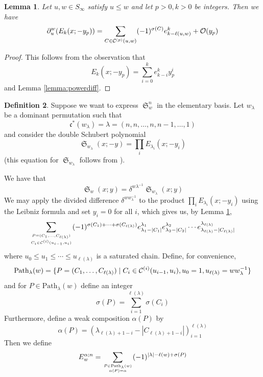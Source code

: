 \documentclass{amsart}
\newtheorem{lemma}{Lemma}[subsection]
\theoremstyle{definition}
\newtheorem{definition}[lemma]{Definition}
\theoremstyle{remark}
\numberwithin{equation}{subsection}
\DeclareMathOperator{\sch}{\mathfrak{S}}
\newcommand{\code}{\mathfrak{c}}
\begin{document}
\begin{lemma} \label{lemma:doublediff}
  Let $u,w\in S_\infty$ satisfy $u\leq w$ and let $p>0,k>0$ be integers. Then we have
  $$\partial_u^w(E_k(x;-y_p))=\sum_{C\in\mathcal{C}^{(p)}(u,w)}(-1)^{\sigma(C)}e_{k-\ell(u,w)}^k+\mathcal{O}(y_p)$$
\end{lemma}

\begin{proof}
This follows from the observation that
$$E_k(x;-y_p) = \sum_{i=0}^k e_{k-i}^k y_p^i$$
and Lemma \ref{lemma:powerdiff}.
\end{proof}

\begin{definition}
Suppose we want to express $\sch_w^n$ in the elementary basis. Let $w_{\lambda}$ be a dominant permutation such that 
$$\code^*(w_\lambda)=\lambda = (n, n, \ldots, n, n - 1,\ldots, 1)$$ 
and consider the double Schubert polynomial
$$\sch_{w_{\lambda}}(x;-y)=\prod_i E_{\lambda_i}(x;-y_i)$$
(this equation for $\sch_{w_\lambda}$ follows from \cite[(6.14)]{notes}).


We have that
$$\sch_w(x;y) = \delta^{w\lambda^{-1}}\sch_{w_{\lambda}}(x;y)$$
We may apply the divided difference $\delta^{ww_\lambda^{-1}}$ to the product $\prod_i E_{\lambda_i}(x;-y_i)$ using the Leibniz formula and set $y_i=0$ for all $i$, which gives us, by Lemma \ref{lemma:doublediff},
$$\sum_{P=(C_1,\ldots,C_{\ell(\lambda)})\atop C_i\in\mathcal{C}^{(i)}(u_{i-1},u_i)}(-1)^{\sigma(C_1)+\cdots+\sigma(C_{\ell(\lambda)})}e_{\lambda_{1}-|C_1|}^{\lambda_1}e_{\lambda_2-|C_2|}^{\lambda_2}\cdots e_{\lambda_{\ell(\lambda)}-|C_{\ell(\lambda)}|}^{\lambda_{\ell(\lambda)}}$$
where $u_0 \leq u_1\leq \cdots \leq u_{\ell(\lambda)}$ is a saturated chain.
Define, for convenience,
$$\mathrm{Path}_\lambda(w) = \{P=(C_1,\ldots,C_{\ell(\lambda)})\mid C_i\in\mathcal{C}^{(i)}(u_{i-1},u_i),u_0=1,u_{\ell(\lambda)}=ww_\lambda^{-1}\}$$
and for $P\in\mathrm{Path}_\lambda(w)$ define an integer
$$\sigma(P) = \sum_{i=1}^{\ell(\lambda)} \sigma(C_i)$$
Furthermore, define a weak composition $\alpha(P)$ by
$$\alpha(P) = (\lambda_{\ell(\lambda) + 1 - i}-|C_{\ell(\lambda) + 1 - i}|)_{i=1}^{\ell(\lambda)}$$
Then we define
$$E^{\alpha;n}_w = \sum_{P \in \mathrm{Path}_\lambda(w)\atop \alpha(P)=\alpha}(-1)^{|\lambda|-\ell(w)+\sigma(P)}$$
\end{definition}
\end{document}
